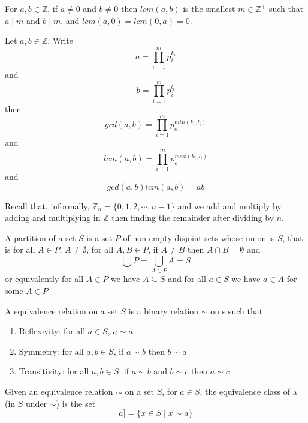 
\begin{defn}
For $a,b \in\mathbb{Z}$, if $a\neq 0$ and $b\neq 0$ then $lcm(a,b)$ is the smallest $m\in\mathbb{Z}^+$  such that $a\mid m$ and $b\mid m$, and $lcm(a,0) =lcm(0,a) = 0$.
\end{defn}


\begin{thm}
Let $a,b\in\mathbb{Z}$. Write \[a = \prod_{i=1}^m p_i^{k_i}\] and \[b = \prod_{i=1}^m p_i^{l_i}\] then \[gcd(a,b) = \prod_{i=1}^m p_o^{min(k_i,l_i)}\] and \[lcm(a,b) = \prod_{i=1}^m p_o^{max(k_i,l_i)}\] and \[gcd(a,b)lcm(a,b) = ab\]
\end{thm}



Recall that, informally, $\mathbb{Z}_n = \{0,1,2,\cdots , n-1\}$ and we add and multiply by adding and multiplying in $\mathbb{Z}$ then finding the remainder after dividing by $n$. 

\begin{defn}[Partition]
A partition of a set $S$ is a set $P$ of non-empty disjoint sets whose union is $S$, that is for all $A\in P$, $A\neq \emptyset$, for all $A,B \in P$, if $A\neq B$ then $A\cap B = \emptyset$ and \[\bigcup P = \bigcup_{A\in P} A = S\] or equivalently for all $A\in P$ we have $A \subseteq S$ and for all $a\in S$ we have $a\in A$ for some $A\in P$
\end{defn}

\begin{defn}
A equivalence relation on a set $S$ is a binary relation $\sim $ on s such that
\begin{enumerate}
\item Reflexivity: for all $a\in S$, $a\sim a$
\item Symmetry: for all $a,b\in S$, if $a\sim b$ then $b\sim a$
\item Transitivity: for all $a,b\in S$, if $a\sim b$ and $b\sim c$ then $a\sim c$
\end{enumerate}
\end{defn}

\begin{defn}
Given an equivalence relation $\sim $ on a set $S$, for $a\in S$, the equivalence class of a (in $S$ under $\sim $) is the set \[a] = \{x\in S \mid x\sim a\}\]
\end{defn}

